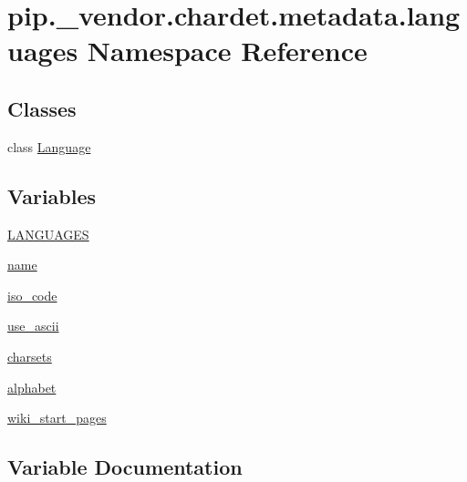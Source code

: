 \hypertarget{namespacepip_1_1__vendor_1_1chardet_1_1metadata_1_1languages}{}\section{pip.\+\_\+vendor.\+chardet.\+metadata.\+languages Namespace Reference}
\label{namespacepip_1_1__vendor_1_1chardet_1_1metadata_1_1languages}
\subsection*{Classes}
\begin{DoxyCompactItemize}
\item 
class \hyperlink{classpip_1_1__vendor_1_1chardet_1_1metadata_1_1languages_1_1Language}{Language}
\end{DoxyCompactItemize}
\subsection*{Variables}
\begin{DoxyCompactItemize}
\item 
\hyperlink{namespacepip_1_1__vendor_1_1chardet_1_1metadata_1_1languages_ab7098a56b2fda072a0259b87dc2b1fed}{L\+A\+N\+G\+U\+A\+G\+ES}
\item 
\hyperlink{namespacepip_1_1__vendor_1_1chardet_1_1metadata_1_1languages_ad572a9b86ec91baa1de083064464faba}{name}
\item 
\hyperlink{namespacepip_1_1__vendor_1_1chardet_1_1metadata_1_1languages_ab3877565041d40db4710004d66a54a20}{iso\+\_\+code}
\item 
\hyperlink{namespacepip_1_1__vendor_1_1chardet_1_1metadata_1_1languages_aa65c4de9b9e7fbf4ef623c5a97677040}{use\+\_\+ascii}
\item 
\hyperlink{namespacepip_1_1__vendor_1_1chardet_1_1metadata_1_1languages_a1d1fa979c34745146c343ecd942a5554}{charsets}
\item 
\hyperlink{namespacepip_1_1__vendor_1_1chardet_1_1metadata_1_1languages_a500da349a4393d7f3cdd693b7a852087}{alphabet}
\item 
\hyperlink{namespacepip_1_1__vendor_1_1chardet_1_1metadata_1_1languages_aeb831b3ad300458d562838accce2a026}{wiki\+\_\+start\+\_\+pages}
\end{DoxyCompactItemize}


\subsection{Variable Documentation}
\mbox{\label{namespacepip_1_1__vendor_1_1chardet_1_1metadata_1_1languages_a500da349a4393d7f3cdd693b7a852087}} 
